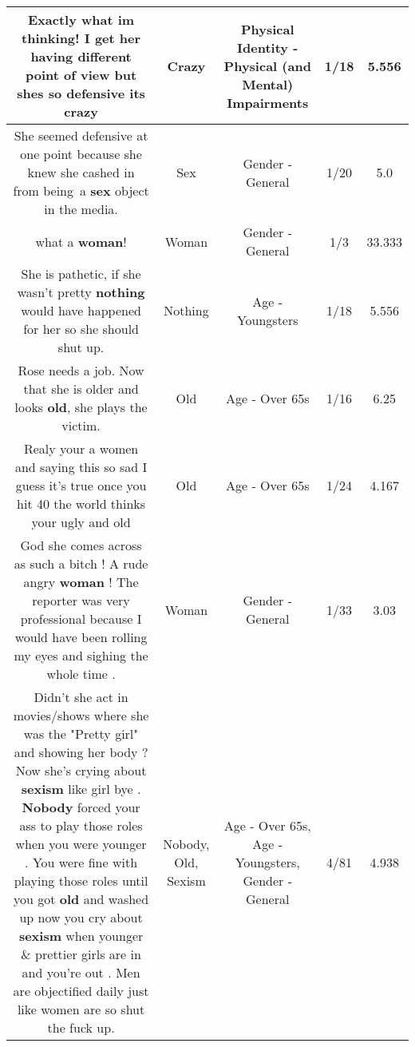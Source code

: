 \documentclass[11pt]{article}
\newlength\mylength
\begin{document}
\begin{center}
\begin{longtable}{|C{.65\mylength}|C{.30\mylength}|C{.12\mylength}|C{.12\mylength}|C{.12\mylength}|}
  \small Exactly what im thinking! I get her having different point of view but shes so defensive its crazy\normalsize   & Crazy & Physical Identity - Physical (and Mental) Impairments & 1/18 & 5.556 \\  \hline
  \small She seemed defensive at one point because she knew she cashed in from being a \textbf{sex} object in the media.\normalsize   & Sex & Gender - General & 1/20 & 5.0 \\  \hline
  \small what a \textbf{woman}!\normalsize   & Woman & Gender - General & 1/3 & 33.333 \\  \hline
  \small She is pathetic, if she wasn't pretty \textbf{nothing} would have happened for her so she should shut up.\normalsize   & Nothing & Age - Youngsters & 1/18 & 5.556 \\  \hline
  \small Rose needs a job. Now that she is older and looks \textbf{old}, she plays the victim.\normalsize   & Old & Age - Over 65s & 1/16 & 6.25 \\  \hline
  \small Realy your a women and saying this so sad I guess it's true once you hit 40 the world thinks your ugly and old\normalsize   & Old & Age - Over 65s & 1/24 & 4.167 \\  \hline
  \small God she comes across as such a bitch ! A rude angry \textbf{woman} ! The reporter was very professional because I would have been rolling my eyes and sighing the whole time .\normalsize   & Woman & Gender - General & 1/33 & 3.03 \\  \hline
  \small Didn't she act in movies/shows where she was the "Pretty girl" and showing her body ? Now she's crying about \textbf{sexism} like girl bye . \textbf{Nobody} forced your ass to play those roles when you were younger . You were fine with playing those roles until you got \textbf{old} and washed up now you cry about \textbf{sexism} when younger \& prettier girls are in and you're out .  Men are objectified daily just like women are so shut the fuck up.\normalsize   & Nobody, Old, Sexism & Age - Over 65s, Age - Youngsters, Gender - General & 4/81 & 4.938 \\  \hline

\end{longtable}
\end{center}
\end{document}
